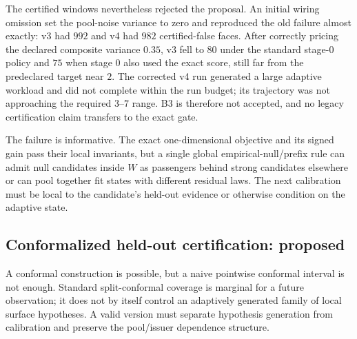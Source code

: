 \documentclass[11pt]{article}
\begin{document}
The certified windows nevertheless rejected the proposal. An initial wiring omission set the
pool-noise variance to zero and reproduced the old failure almost exactly: v3 had $992$ and v4 had
$982$ certified-false faces. After correctly pricing the declared composite variance $0.35$, v3 fell
to $80$ under the standard stage-0 policy and $75$ when stage 0 also used the exact score, still far
from the predeclared target near $2$. The corrected v4 run generated a large adaptive workload and
did not complete within the run budget; its trajectory was not approaching the required $3$--$7$
range. B3 is therefore not accepted, and no legacy certification claim transfers to the exact gate.

The failure is informative. The exact one-dimensional objective and its signed gain pass their local
invariants, but a single global empirical-null/prefix rule can admit null candidates inside $W$ as
passengers behind strong candidates elsewhere or can pool together fit states with different residual
laws. The next calibration must be local to the candidate's held-out evidence or otherwise condition
on the adaptive state.

\subsection*{Conformalized held-out certification: proposed}
A conformal construction is possible, but a naive pointwise conformal interval is not enough. Standard
split-conformal coverage is marginal for a future observation; it does not by itself control an
adaptively generated family of local surface hypotheses. A valid version must separate hypothesis
generation from calibration and preserve the pool/issuer dependence structure.
\end{document}
